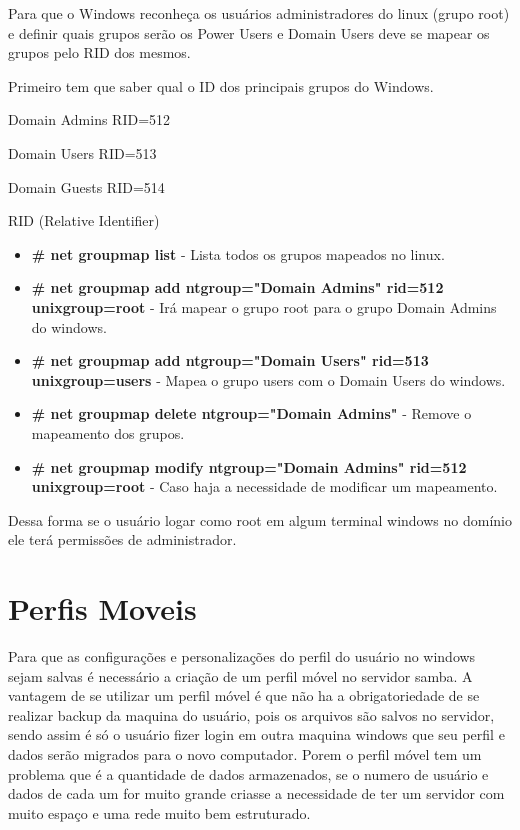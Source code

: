 Para que o Windows reconheça os usuários administradores do linux (grupo root) e definir quais grupos serão os Power Users e Domain Users deve se mapear os grupos pelo RID dos mesmos.

Primeiro tem que saber qual o ID dos principais grupos do Windows.

Domain Admins RID=512 

Domain Users RID=513 

Domain Guests RID=514

RID (Relative Identifier) 

\begin{itemize}
	\item \textbf{\# net groupmap list} - Lista todos os grupos mapeados no linux.
	\item \textbf{\# net groupmap add ntgroup="Domain Admins" rid=512 unixgroup=root} - Irá mapear o grupo root para o grupo Domain Admins do windows.
	\item \textbf{\# net groupmap add ntgroup="Domain Users" rid=513 unixgroup=users} - Mapea o grupo users com o Domain Users do windows.
	\item \textbf{\# net groupmap delete ntgroup="Domain Admins"} - Remove o mapeamento dos grupos.
	\item \textbf{\# net groupmap modify ntgroup="Domain Admins" rid=512 unixgroup=root} - Caso haja a necessidade de modificar um mapeamento.
\end{itemize}

Dessa forma se o usuário logar como root em algum terminal windows no domínio ele terá permissões de administrador.

\section{Perfis Moveis}

Para que as configurações e personalizações do perfil do usuário no windows sejam salvas é necessário a criação de um perfil móvel no servidor samba. 
A vantagem de se utilizar um perfil móvel é que não ha a obrigatoriedade de se realizar backup da maquina do usuário, pois os arquivos são salvos no servidor, sendo assim é só o usuário fizer login em outra maquina windows que seu perfil e dados serão migrados para o novo computador. Porem o perfil móvel tem um problema que é a quantidade de dados armazenados, se o numero de usuário e dados de cada um for muito grande criasse a necessidade de ter um servidor com muito espaço e uma rede muito bem estruturado. 

